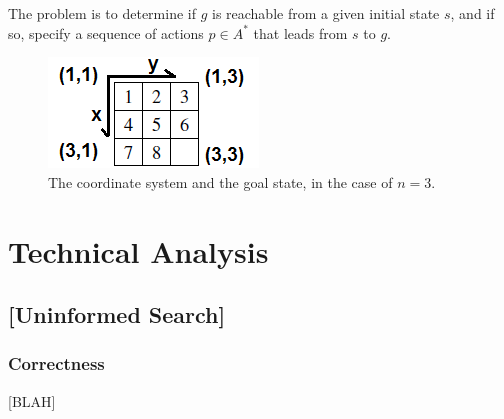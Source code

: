 \documentclass[runningheads]{llncs}
\begin{document}
The problem is to determine if $g$ is reachable from a given initial state $s$, and if so, specify a sequence of actions $p \in A^\ast$ that leads from $s$ to $g$.



\begin{figure}
	\centering
	\includegraphics{coord_system.png}
	\caption{The coordinate system and the goal state, in the case of $n=3$.} \label{fig:coordsystem}
\end{figure}



\section{Technical Analysis}
\subsection{[Uninformed Search]}
\subsubsection{Correctness}
[BLAH]

%


%
%
\end{document}
